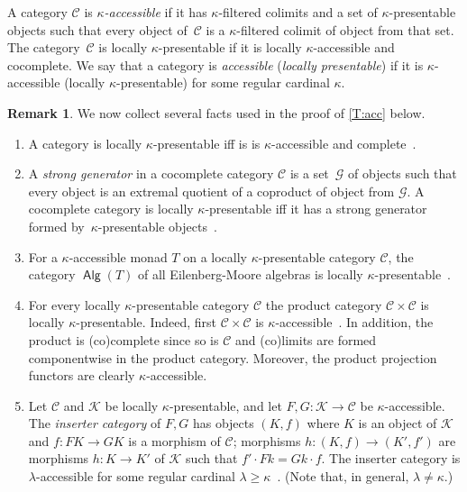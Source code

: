 \documentclass[sigconf,
			final%
			nonacm
                        ]{acmart}
\numberwithin{equation}{section}
\numberwithin{equation}{section}
\theoremstyle{plain}
\theoremstyle{definition}
\newtheorem{rem}[thm]{Remark}
\newcommand{\CatC}{\mathscr{C}}           %
\newcommand{\CatK}{\mathscr{K}}
\newcommand{\CatG}{\mathscr{G}}
\DeclareMathOperator{\Alg}{\mathsf{Alg}}
\begin{document}
A category $\CatC$ is \emph{$\kappa$-accessible} if it has
$\kappa$-filtered colimits and a set of $\kappa$-presentable objects
such that every object of~$\CatC$ is a $\kappa$-filtered colimit of
object from that set. The category~$\CatC$ is locally
$\kappa$-presentable if it is locally $\kappa$-accessible and
cocomplete. We say that a category is \emph{accessible} (\emph{locally presentable})
if it is $\kappa$-accessible (locally $\kappa$-presentable) for some
regular cardinal $\kappa$.

\begin{rem}\label{R:acc}
  We now collect several facts used in the proof of \cref{T:acc} below.
  \begin{enumerate}
  \item\label{R:acc:1} A category is locally $\kappa$-presentable iff
    is is $\kappa$-accessible and complete~\cite[Cor.~2.47]{AR94}.


  \item\label{R:acc:1a} A \emph{strong generator} in a cocomplete
    category $\CatC$ is a set~$\CatG$ of objects such that every
    object is an extremal quotient of a coproduct of object from
    $\CatG$. A cocomplete category is locally $\kappa$-presentable iff
    it has a strong generator formed by~$\kappa$-presentable
    objects~\cite[Thm.~1.20]{AR94}.

  \item\label{R:acc:2} For a $\kappa$-accessible monad $T$ on a
    locally $\kappa$-presentable category $\CatC$, the category
    $\Alg(T)$ of all Eilenberg-Moore algebras is locally
    $\kappa$-presentable~\cite[Thm.~\& Rem.~2.78]{AR94}.

  \item\label{R:acc:2a} For every locally $\kappa$-presentable
    category $\CatC$ the product category $\CatC \times \CatC$ is
    locally $\kappa$-presentable. Indeed, first $\CatC \times \CatC$
    is $\kappa$-accessible~\cite[Prop.~2.67]{AR94}. In addition, the
    product is (co)complete since so is $\CatC$ and (co)limits are
    formed componentwise in the product category. Moreover, the product
    projection functors are clearly $\kappa$-accessible.

  \item\label{R:acc:3} Let $\CatC$ and $\CatK$ be locally
    $\kappa$-presentable, and let $F, G\colon \CatK \to \CatC$ be
    $\kappa$-accessible. The \emph{inserter category} of $F,G$ has
    objects $(K,f)$ where $K$ is an object of $\CatK$ and
    $f\colon FK \to GK$ is a morphism of $\CatC$; morphisms
    $h\colon (K,f) \to (K',f')$ are morphisms $h\colon K \to K'$ of
    $\CatK$ such that $f' \cdot Fk = Gk \cdot f$. The inserter
    category is $\lambda$-accessible for some regular cardinal
    $\lambda \geq \kappa$~\cite[Thm.~2.72]{AR94}. (Note that, in
    general, $\lambda \neq \kappa$.)%


\end{enumerate}
\end{rem}
\end{document}
